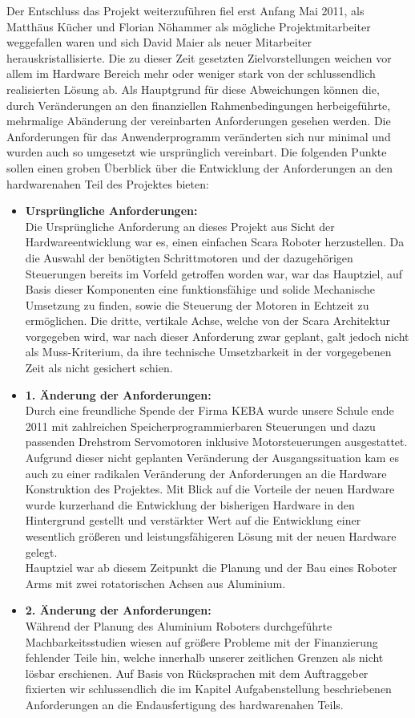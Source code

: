 Der Entschluss das Projekt weiterzuführen fiel erst Anfang Mai 2011, als Matthäus Kücher und Florian Nöhammer als mögliche Projektmitarbeiter weggefallen waren und sich David Maier als neuer Mitarbeiter herauskristallisierte. 
Die zu dieser Zeit gesetzten Zielvorstellungen weichen vor allem im Hardware Bereich mehr oder weniger stark von der schlussendlich realisierten Lösung ab. Als Hauptgrund für diese Abweichungen können die, durch Veränderungen an den finanziellen Rahmenbedingungen herbeigeführte, mehrmalige Abänderung der vereinbarten Anforderungen gesehen werden. Die Anforderungen für das Anwenderprogramm veränderten sich nur minimal und wurden auch so umgesetzt wie ursprünglich vereinbart.
Die folgenden Punkte sollen einen groben Überblick über die Entwicklung der Anforderungen an den hardwarenahen Teil des Projektes bieten:
\begin{itemize}
\item \textbf{Ursprüngliche Anforderungen:}\\
Die Ursprüngliche Anforderung an dieses Projekt aus Sicht der Hardwareentwicklung war es, einen einfachen Scara Roboter herzustellen. Da die Auswahl der benötigten Schrittmotoren und der dazugehörigen Steuerungen bereits im Vorfeld getroffen worden war, war das Hauptziel, auf Basis dieser Komponenten eine funktionsfähige und solide Mechanische Umsetzung zu finden, sowie die Steuerung der Motoren in Echtzeit zu ermöglichen.
Die dritte, vertikale Achse, welche von der Scara Architektur vorgegeben wird, war nach dieser Anforderung zwar geplant, galt jedoch nicht als Muss-Kriterium, da ihre technische Umsetzbarkeit in der vorgegebenen Zeit als nicht gesichert schien.
\item \textbf{1. Änderung der Anforderungen:}\\
Durch eine freundliche Spende der Firma KEBA wurde unsere Schule ende 2011 mit zahlreichen Speicherprogrammierbaren Steuerungen und dazu passenden Drehstrom Servomotoren inklusive Motorsteuerungen ausgestattet. Aufgrund dieser nicht geplanten Veränderung der Ausgangssituation kam es auch zu einer radikalen Veränderung der Anforderungen an die Hardware Konstruktion des Projektes. 
Mit Blick auf die Vorteile der neuen Hardware wurde kurzerhand die Entwicklung der bisherigen Hardware in den Hintergrund gestellt und verstärkter Wert auf die Entwicklung einer wesentlich größeren und leistungsfähigeren Lösung mit der neuen Hardware gelegt.\\
Hauptziel war ab diesem Zeitpunkt die Planung und der Bau eines Roboter Arms mit zwei rotatorischen Achsen aus Aluminium.

\item \textbf{2. Änderung der Anforderungen:}\\
Während der Planung des Aluminium Roboters durchgeführte Machbarkeitsstudien wiesen auf größere Probleme mit der Finanzierung fehlender Teile hin, welche innerhalb unserer zeitlichen Grenzen als nicht lösbar erschienen. Auf Basis von Rücksprachen mit dem Auftraggeber fixierten wir schlussendlich die im Kapitel Aufgabenstellung beschriebenen Anforderungen an die Endausfertigung des hardwarenahen Teils.
\end{itemize}
